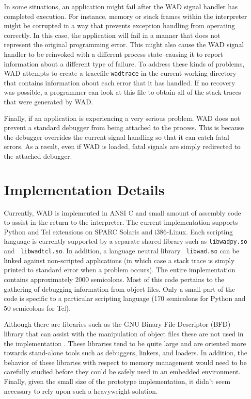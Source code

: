 In some situations, an application might fail after the WAD signal
handler has completed execution.  For instance, memory or stack frames
within the interpreter might be corrupted in a way that prevents
exception handling from operating correctly.  In this case, the
application will fail in a manner that does not represent the original
programming error. This might also cause the WAD signal handler to be
reinvoked with a different process state--causing it to report
information about a different type of failure.  To address these kinds
of problems, WAD attempts to create a tracefile {\tt wadtrace} in the
current working directory that contains information about each error
that it has handled.  If no recovery was possible, a programmer can
look at this file to obtain all of the stack traces that were generated 
by WAD.

Finally, if an application is experiencing a very serious problem, WAD
does not prevent a standard debugger from being attached to the
process.  This is because the debugger overrides the current signal
handling so that it can catch fatal errors.  As a result, even if
WAD is loaded, fatal signals are simply redirected to the
attached debugger.  

\section{Implementation Details}

Currently, WAD is implemented in ANSI C and small amount of assembly
code to assist in the return to the interpreter.  The current
implementation supports Python and Tcl extensions on SPARC Solaris and
i386-Linux.  Each scripting language is currently supported by a
separate shared library such as {\tt libwadpy.so} and {\tt
libwadtcl.so}.  In addition, a language neutral library {\tt
libwad.so} can be linked against non-scripted applications (in which case
a stack trace is simply printed to standard error when a problem occurs). 
The entire implementation contains approximately 2000
semicolons. Most of this code pertains to the gathering of debugging
information from object files.  Only a small part of the code is
specific to a particular scripting language (170 semicolons for Python
and 50 semicolons for Tcl).

Although there are libraries such as the GNU Binary File Descriptor
(BFD) library that can assist with the manipulation of object files
these are not used in the implementation \cite{bfd}.  These
libraries tend to be quite large and are oriented more towards
stand-alone tools such as debuggers, linkers, and loaders.  In addition,
the behavior of these libraries with respect to memory management
would need to be carefully studied before they could be safely used in
an embedded environment. Finally, given the small size of the prototype 
implementation, it didn't seem necessary to rely upon such a 
heavyweight solution.

